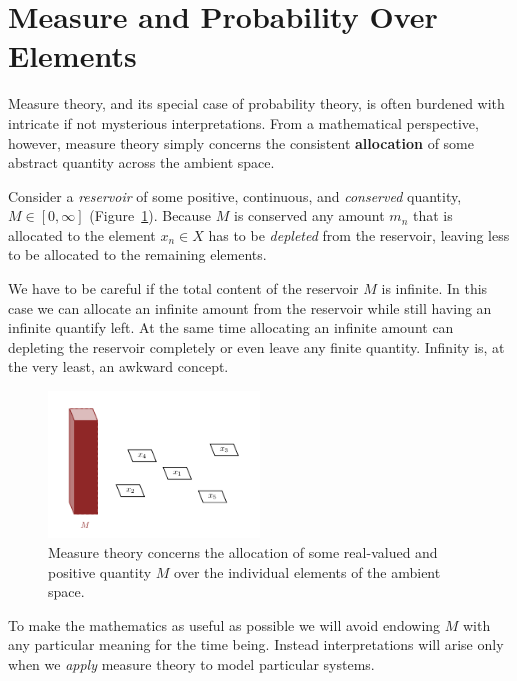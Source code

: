 \documentclass[
  letterpaper,
  DIV=11,
  numbers=noendperiod]{scrartcl}
\begin{document}
\hypertarget{measure-and-probability-over-elements}{%
\section{Measure and Probability Over
Elements}\label{measure-and-probability-over-elements}}

Measure theory, and its special case of probability theory, is often
burdened with intricate if not mysterious interpretations. From a
mathematical perspective, however, measure theory simply concerns the
consistent \textbf{allocation} of some abstract quantity across the
ambient space.

Consider a \emph{reservoir} of some positive, continuous, and
\emph{conserved} quantity, \(M \in [0, \infty]\)
(Figure~\ref{fig-reservoir}). Because \(M\) is conserved any amount
\(m_{n}\) that is allocated to the element \(x_{n} \in X\) has to be
\emph{depleted} from the reservoir, leaving less to be allocated to the
remaining elements.

We have to be careful if the total content of the reservoir \(M\) is
infinite. In this case we can allocate an infinite amount from the
reservoir while still having an infinite quantify left. At the same time
allocating an infinite amount can depleting the reservoir completely or
even leave any finite quantity. Infinity is, at the very least, an
awkward concept.

\begin{figure}

{\centering \includegraphics[width=0.5\textwidth,height=\textheight]{figures/allocations/0/0.pdf}

}

\caption{\label{fig-reservoir}Measure theory concerns the allocation of
some real-valued and positive quantity \(M\) over the individual
elements of the ambient space.}

\end{figure}

To make the mathematics as useful as possible we will avoid endowing
\(M\) with any particular meaning for the time being. Instead
interpretations will arise only when we \emph{apply} measure theory to
model particular systems.
\end{document}
